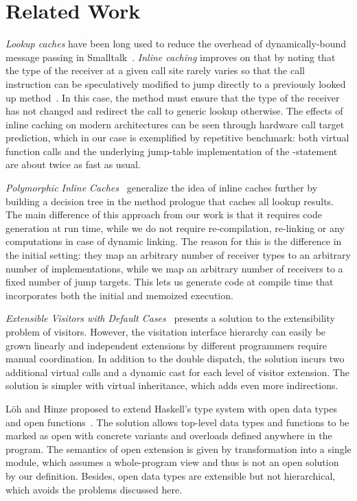 \section{Related Work} %
\label{sec:rw}

\emph{Lookup caches} have been long used to reduce the overhead of 
dynamically-bound message passing in Smalltalk~\cite{UngarPatterson83}. 
\emph{Inline caching} improves on that by noting that the type of the receiver at a given 
call site rarely varies so that the call instruction can be speculatively 
modified to jump directly to a previously looked up method~\cite{Deutsch84}. 
In this case, the method must ensure that the type of the receiver has 
not changed and redirect the call to generic lookup otherwise. The effects of 
inline caching on modern architectures can be seen through hardware call target 
prediction, which in our case is exemplified by repetitive benchmark: both 
virtual function calls and the underlying jump-table implementation of the 
-statement are about twice as fast as usual.

\emph{Polymorphic Inline Caches}~\cite{Holzle:Chambers:Ungar:91} generalize the 
idea of inline caches further by building a decision tree in the method prologue 
that caches all lookup results. The main difference of this approach from our 
work is that it requires code generation at run time, while we do not require
re-compilation, re-linking or any computations in case of dynamic linking.
The reason for this is the difference in the initial setting: they map an
arbitrary number of receiver types to an arbitrary number of implementations, while 
we map an arbitrary number of receivers to a fixed number of jump 
targets. This lets us generate code at compile time that incorporates both the 
initial and memoized execution.

\emph{Extensible Visitors with Default Cases}~\cite[]{Zenger:2001} presents a solution to the extensibility problem of visitors. 
However, the visitation interface 
hierarchy can easily be grown linearly and independent extensions by different  
programmers require manual coordination. In addition to the double dispatch, the 
solution incurs two additional virtual calls and a dynamic cast for each 
level of visitor extension. The solution is simpler with virtual inheritance, 
which adds even more indirections.

L\"{o}h and Hinze proposed to extend Haskell's type system with open data types 
and open functions~\cite{LohHinze2006}. The solution allows top-level data types 
and functions to be marked as open with concrete variants and overloads defined 
anywhere in the program. The semantics of open extension is given by 
transformation into a single module, which assumes a whole-program view and thus 
is not an open solution by our definition. Besides, open data types are extensible but not 
hierarchical, which avoids the problems discussed here.

